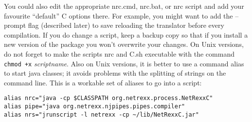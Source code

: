 \begin{enumerate}
You could also edit the appropriate nrc.cmd, nrc.bat, or nrc script
and add your favourite “default” \nr{}C options there. For example,
you might want to add the –prompt flag (described later) to save
reloading the translator before every compilation. If you do change a
script, keep a backup copy so that if you install a new version of the
\nr{} package you won’t overwrite your changes. On Unix versions, do
not forget to make the scripts nrc and \nr{}C.sh executable with the
command \texttt{chmod +x} \emph{scriptname}. Also on Unix versions, it
is better to use a command alias to start java classes; it avoids
problems with the splitting of strings on the command line. This is a
workable set of aliases to go into a  script:
\begin{verbatim}
alias nrc="java -cp $CLASSPATH org.netrexx.process.NetRexxC"
alias pipe="java org.netrexx.njpipes.pipes.compiler"
alias nrs="jrunscript -l netrexx -cp ~/lib/NetRexxC.jar"
\end{verbatim}
\end{enumerate}
